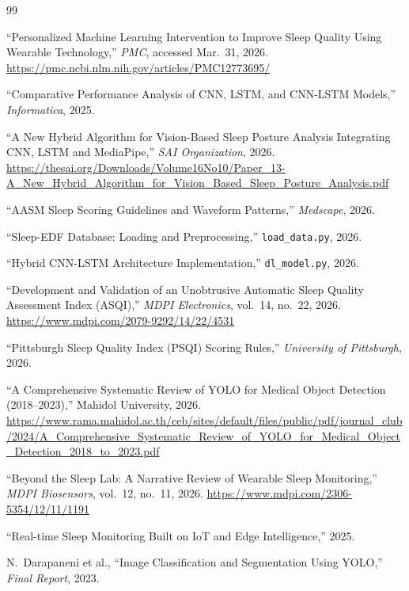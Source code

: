 \documentclass[10pt, a4paper, twocolumn]{article}
\begin{document}
\begin{thebibliography}{99}

  ``Personalized Machine Learning Intervention to Improve Sleep Quality Using
  Wearable Technology,'' \textit{PMC}, accessed Mar.~31, 2026.
  \url{https://pmc.ncbi.nlm.nih.gov/articles/PMC12773695/}

  ``Comparative Performance Analysis of CNN, LSTM, and CNN-LSTM Models,''
  \textit{Informatica}, 2025.

  ``A New Hybrid Algorithm for Vision-Based Sleep Posture Analysis Integrating CNN,
  LSTM and MediaPipe,'' \textit{SAI Organization}, 2026.
  \url{https://thesai.org/Downloads/Volume16No10/Paper_13-A_New_Hybrid_Algorithm_for_Vision_Based_Sleep_Posture_Analysis.pdf}

  ``AASM Sleep Scoring Guidelines and Waveform Patterns,'' \textit{Medscape}, 2026.

  ``Sleep-EDF Database: Loading and Preprocessing,'' \texttt{load\_data.py}, 2026.

  ``Hybrid CNN-LSTM Architecture Implementation,'' \texttt{dl\_model.py}, 2026.

  ``Development and Validation of an Unobtrusive Automatic Sleep Quality Assessment
  Index (ASQI),'' \textit{MDPI Electronics}, vol.~14, no.~22, 2026.
  \url{https://www.mdpi.com/2079-9292/14/22/4531}

  ``Pittsburgh Sleep Quality Index (PSQI) Scoring Rules,''
  \textit{University of Pittsburgh}, 2026.

  ``A Comprehensive Systematic Review of YOLO for Medical Object Detection
  (2018--2023),'' Mahidol University, 2026.
  \url{https://www.rama.mahidol.ac.th/ceb/sites/default/files/public/pdf/journal_club/2024/A_Comprehensive_Systematic_Review_of_YOLO_for_Medical_Object_Detection_2018_to_2023.pdf}

  ``Beyond the Sleep Lab: A Narrative Review of Wearable Sleep Monitoring,''
  \textit{MDPI Biosensors}, vol.~12, no.~11, 2026.
  \url{https://www.mdpi.com/2306-5354/12/11/1191}

  ``Real-time Sleep Monitoring Built on IoT and Edge Intelligence,'' 2025.

  N.~Darapaneni et al., ``Image Classification and Segmentation Using YOLO,''
  \textit{Final Report}, 2023.

\end{thebibliography}
\end{document}
